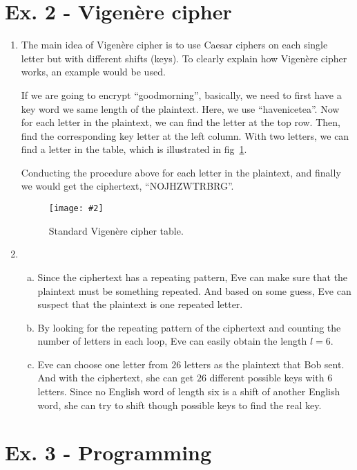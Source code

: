 \documentclass[11pt,a4paper]{article}
\newcommand{\image}[3]{
	\begin{figure}[!ht]
		\centering
	    \texttt{[image: \#2]}
		\caption{#3}
		\label{fig:#2}
	\end{figure}
}
\begin{document}
\section*{Ex. 2 - Vigen\`{e}re cipher}
\begin{enumerate}
	\item The main idea of Vigen\`{e}re cipher is to use Caesar ciphers on each single letter but with different shifts (keys). To clearly explain how Vigen\`{e}re cipher works, an example would be used.
	\par If we are going to encrypt ``goodmorning'', basically, we need to first have a key word we same length of the plaintext. Here, we use ``havenicetea''. Now for each letter in the plaintext, we can find the letter at the top row. Then, find the corresponding key letter at the left column. With two letters, we can find a letter in the table, which is illustrated in fig~\ref{fig:VCTable}.
	\par Conducting the procedure above for each letter in the plaintext, and finally we would get the ciphertext, ``NOJHZWTRBRG''.
	\image{0.65}{VCTable}{Standard Vigen\`{e}re cipher table.}
	
	\item
	\begin{enumerate}[a)]
		\item Since the ciphertext has a repeating pattern, Eve can make sure that the plaintext must be something repeated. And based on some guess, Eve can suspect that the plaintext is one repeated letter.
		
		\item By looking for the repeating pattern of the ciphertext and counting the number of letters in each loop, Eve can easily obtain the length $l=6$.
		
		\item Eve can choose one letter from $26$ letters as the plaintext that Bob sent. And with the ciphertext, she can get $26$ different possible keys with $6$ letters. Since no English word of length six is a shift of another English word, she can try to shift though possible keys to find the real key.
	\end{enumerate}
\end{enumerate}

\section*{Ex. 3 - Programming}
\end{document}
